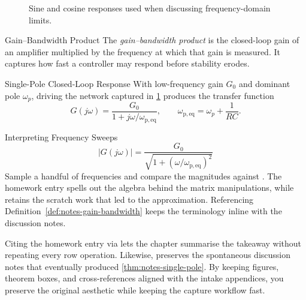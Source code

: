 \begin{figure}[H]
  \centering
  \caption{Sine and cosine responses used when discussing frequency-domain limits.}
  \label{fig:notes-main-plot}
\end{figure}


\begin{definitionBox}{Gain--Bandwidth Product}
\label{def:notes-gain-bandwidth}
The \emph{gain--bandwidth product} is the closed-loop gain of an amplifier
multiplied by the frequency at which that gain is measured. It captures how
fast a controller may respond before stability erodes.
\end{definitionBox}

\begin{theoremBox}{Single-Pole Closed-Loop Response}
\label{thm:notes-single-pole}
With low-frequency gain $G_0$ and dominant pole $\omega_p$, driving the network
captured in \cref{fig:notes-main-plot} produces the transfer function
\[
  G(j\omega) = \frac{G_0}{1 + j\omega/\omega_{\mathrm{p,eq}}}, \qquad
  \omega_{\mathrm{p,eq}} = \omega_p + \frac{1}{RC}.
\]
\end{theoremBox}

\begin{textexample}{Interpreting Frequency Sweeps}
\label{ex:notes-frequency-sweep}
\[
  \left|G(j\omega)\right| = \frac{G_0}{\sqrt{1 + (\omega/\omega_{\mathrm{p,eq}})^2}}
\]
\solutiontag\; Sample a handful of frequencies and compare the magnitudes against
. The homework entry spells out the algebra behind the
matrix manipulations, while  retains the scratch work
that led to the approximation. Referencing Definition~\ref{def:notes-gain-bandwidth}
keeps the terminology inline with the discussion notes.
\end{textexample}

Citing the homework entry via  lets the chapter summarise
the takeaway without repeating every row operation. Likewise,
 preserves the spontaneous discussion notes that
eventually produced \cref{thm:notes-single-pole}. By keeping figures, theorem
boxes, and cross-references aligned with the intake appendices, you preserve the
original aesthetic while keeping the capture workflow fast.

